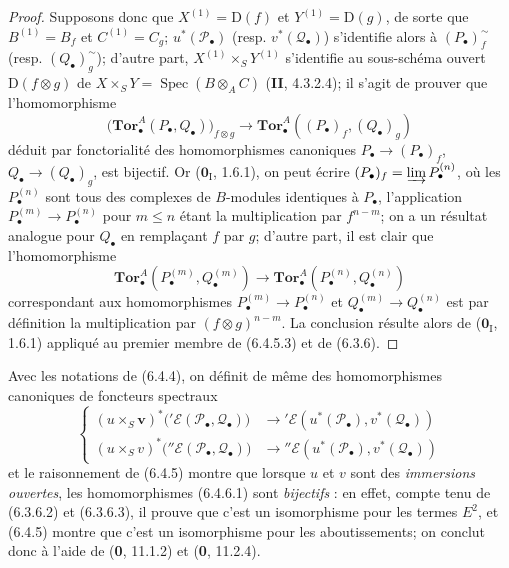 \begin{proof}
Supposons donc que $X^{(1)}=\mathrm D(f)$ et $Y^{(1)}=\mathrm D(g)$, de sorte
que $B^{(1)}=B_f$ et $C^{(1)}=C_g$; $u^*(\mathscr P_\bullet)$ (resp.
$v^*(\mathscr Q_\bullet)$) s'identifie alors à
$(P_\bullet)_f^{\sim}$ (resp. $(Q_\bullet)_g^{\sim}$); d'autre part,
$X^{(1)}\times_S Y^{(1)}$ s'identifie au sous-schéma ouvert
$\mathrm D(f\otimes g)$ de
$X\times_S Y=\operatorname{Spec}(B\otimes_A C)$ (\textbf{II}, 4.3.2.4); il s'agit de
prouver que l'homomorphisme
\[
  \bigl(\mathbf{Tor}_\bullet^A(P_\bullet,Q_\bullet)\bigr)_{f\otimes g}
  \longrightarrow
  \mathbf{Tor}_\bullet^A((P_\bullet)_f,(Q_\bullet)_g)
  \tag{6.4.5.3}\label{III.6.4.5.3.fr}
\]
déduit par fonctorialité des homomorphismes canoniques
$P_\bullet\to(P_\bullet)_f$, $Q_\bullet\to(Q_\bullet)_g$, est bijectif. Or
($\mathbf{0}_{\mathrm I}$, 1.6.1), on peut écrire
$(P_\bullet)_f=\varinjlim P_\bullet^{(n)}$, où les $P_\bullet^{(n)}$ sont tous
des complexes de $B$-modules identiques à $P_\bullet$, l'application
$P_\bullet^{(m)}\to P_\bullet^{(n)}$ pour $m\leqslant n$ étant la
multiplication par $f^{n-m}$; on a un résultat analogue pour $Q_\bullet$ en
remplaçant $f$ par $g$; d'autre part, il est clair que l'homomorphisme
\[
  \mathbf{Tor}_\bullet^A(P_\bullet^{(m)},Q_\bullet^{(m)})
  \longrightarrow
  \mathbf{Tor}_\bullet^A(P_\bullet^{(n)},Q_\bullet^{(n)})
\]
correspondant aux homomorphismes
$P_\bullet^{(m)}\to P_\bullet^{(n)}$ et
$Q_\bullet^{(m)}\to Q_\bullet^{(n)}$ est par définition la multiplication
par $(f\otimes g)^{n-m}$. La conclusion résulte alors de ($\mathbf{0}_{\mathrm I}$,
1.6.1) appliqué au premier membre de (6.4.5.3) et de (6.3.6).
\end{proof}

\begin{env}[6.4.6]
Avec les notations de (6.4.4), on définit de même des homomorphismes canoniques
de foncteurs spectraux
\[
  \left\{
  \begin{aligned}
  (u\times_S \boldsymbol{v})^*\bigl('\mathscr E(\mathscr P_\bullet,\mathscr Q_\bullet)\bigr)
    &\longrightarrow
      '\mathscr E(u^*(\mathscr P_\bullet),v^*(\mathscr Q_\bullet))\\
  (u\times_S v)^*\bigl(''\mathscr E(\mathscr P_\bullet,\mathscr Q_\bullet)\bigr)
    &\longrightarrow
      ''\mathscr E(u^*(\mathscr P_\bullet),v^*(\mathscr Q_\bullet))
  \end{aligned}
  \right.
  \tag{6.4.6.1}\label{III.6.4.6.1.fr}
\]
et le raisonnement de (6.4.5) montre que lorsque $u$ et $v$ sont des
\emph{immersions ouvertes}, les homomorphismes (6.4.6.1) sont \emph{bijectifs} : en effet,
compte tenu de (6.3.6.2) et (6.3.6.3), il prouve que c'est un isomorphisme pour
les termes $E^2$, et (6.4.5) montre que c'est un isomorphisme pour les
aboutissements; on conclut donc à l'aide de (\textbf{0}, 11.1.2) et (\textbf{0}, 11.2.4).
\end{env}

